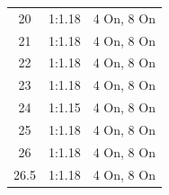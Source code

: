 \begin{table}
\begin{tabular}{ccc}
		20	 	&	1:1.18	&	4 On, 8 On \\
		21	 	&	1:1.18	&	4 On, 8 On \\
		22	 	&	1:1.18	&	4 On, 8 On \\
		23	 	&	1:1.18	&	4 On, 8 On \\								
		24	 	&	1:1.15	&	4 On, 8 On \\
		25	 	&	1:1.18	&	4 On, 8 On \\
		26	 	&	1:1.18	&	4 On, 8 On \\
		26.5 	&	1:1.18	&	4 On, 8 On \\	
		\bottomrule	
	\end{tabular}
\end{table}




